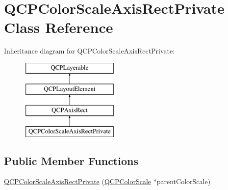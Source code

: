 \hypertarget{classQCPColorScaleAxisRectPrivate}{\section{\-Q\-C\-P\-Color\-Scale\-Axis\-Rect\-Private \-Class \-Reference}
\label{classQCPColorScaleAxisRectPrivate}
}
\-Inheritance diagram for \-Q\-C\-P\-Color\-Scale\-Axis\-Rect\-Private\-:\begin{figure}[H]
\begin{center}
\leavevmode
\includegraphics[height=4.000000cm]{classQCPColorScaleAxisRectPrivate}
\end{center}
\end{figure}
\subsection*{\-Public \-Member \-Functions}
\begin{DoxyCompactItemize}
\item 
\hyperlink{classQCPColorScaleAxisRectPrivate_ad3b242f75dd2b33581364a4e668a80db}{\-Q\-C\-P\-Color\-Scale\-Axis\-Rect\-Private} (\hyperlink{classQCPColorScale}{\-Q\-C\-P\-Color\-Scale} $\ast$parent\-Color\-Scale)
\end{DoxyCompactItemize}
